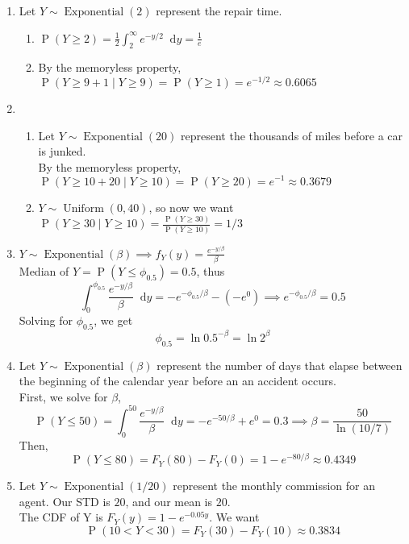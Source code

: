 \documentclass{article}
\newcommand{\pr}[1]{\operatorname{P}\left(#1\right)}
\newcommand{\unidist}[3]{#1 \sim \operatorname{Uniform}(#2, #3)}
\newcommand{\expdist}[2]{#1 \sim \operatorname{Exponential}(#2)}
\newcommand*\diff{\mathop{}\!\mathrm{d}}
\newcommand{\intv}[4]{\int_{#3}^{#4} #1 \diff #2}
\begin{document}
\begin{enumerate}
  \item Let $\expdist{Y}{2}$ represent the repair time.
  \begin{enumerate}
    \item $\pr{Y \geq 2} = \frac{1}{2}\intv{e^{-y/2}}{y}{2}{\infty} = \frac{1}{e}$
    \item By the memoryless property,
    $\pr{Y \geq 9 + 1 \mid Y \geq 9} = \pr{Y \geq 1} = e^{-1/2} \approx 0.6065$
  \end{enumerate}

  \item \begin{enumerate}
    \item Let $\expdist{Y}{20}$ represent the thousands of miles before a car is junked.\\
    By the memoryless property, 
    $\pr{Y \geq 10 + 20 \mid Y \geq 10} = \pr{Y \geq 20} = e^{-1} \approx 0.3679$
    \item $\unidist{Y}{0}{40}$, so now we want
    $\pr{Y \geq 30 \mid Y \geq 10} = \frac{\pr{Y \geq 30}}{\pr{Y \geq 10}} = 1/3$
  \end{enumerate}

  \item $\expdist{Y}{\beta} \implies f_Y(y) = \frac{e^{-y/\beta}}{\beta}$\\
  Median of $Y = \pr{Y \leq \phi_{0.5}} = 0.5$, thus \[
    \intv{\frac{e^{-y/\beta}}{\beta}}{y}{0}{\phi_{0.5}} 
    = -e^{-\phi_{0.5}/\beta} - (-e^{0}) \implies e^{-\phi_{0.5}/\beta} = 0.5
  \]
  Solving for $\phi_{0.5}$, we get \[
    \phi_{0.5} = \ln0.5^{-\beta} = \ln2^{\beta}
  \]

  \item Let $\expdist{Y}{\beta}$ represent the number of days that elapse between the
  beginning of the calendar year before an an accident occurs.\\
  First, we solve for $\beta$, \[
    \pr{Y\leq 50} = \intv{\frac{e^{-y/\beta}}{\beta}}{y}{0}{50} 
    = -e^{-50/\beta} + e^{0} = 0.3 \implies \beta = \frac{50}{\ln(10/7)}
  \]
  Then, \[
    \pr{Y \leq 80} = F_Y(80) - F_Y(0) = 1 - e^{-80/\beta} \approx 0.4349
  \]

  \item Let $\expdist{Y}{1/20}$ represent the monthly commission for an agent.
  Our STD is $20$, and our mean is $20$.\\
  The CDF of Y is $F_Y(y) = 1-e^{-0.05y}$.
  We want \[
    \pr{10 < Y < 30} = F_Y(30) - F_Y(10) \approx 0.3834
  \]


\end{enumerate}
\end{document}
